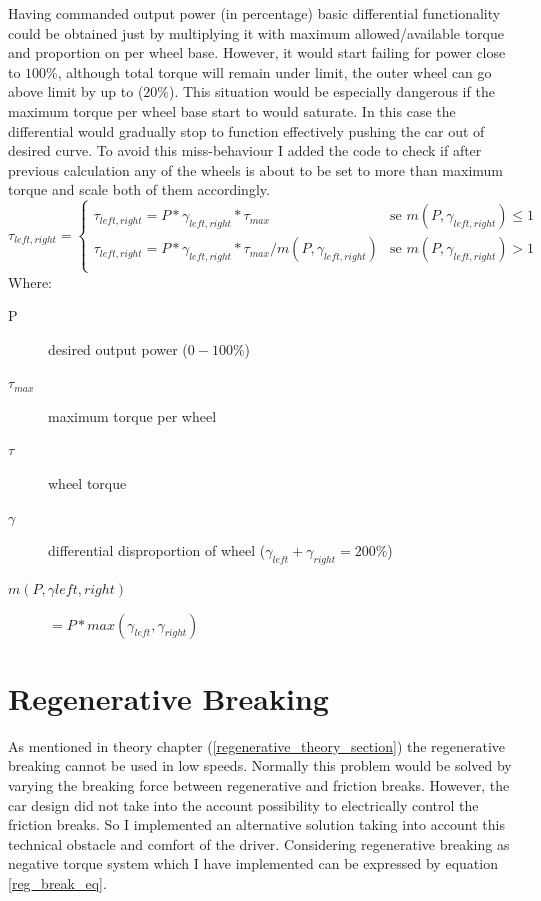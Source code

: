 Having commanded output power (in percentage) basic differential functionality could be obtained just by multiplying it with maximum allowed/available torque and proportion on per wheel base. However, it would start failing for power close to $100\% $, although total torque will remain under limit, the outer wheel can go above limit by up to ($20\% $).
This situation would be especially dangerous if the maximum torque per wheel base start to would saturate. In this case the differential would gradually stop to function effectively pushing the car out of desired curve.
To avoid this miss-behaviour I added the code to check if after previous calculation any of the wheels is about to be set to more than maximum torque and scale both of them accordingly.
\begin{equation*}
    \tau_{left,right} = \begin{cases}
        \tau_{left,right} = P * \gamma_{left,right} * \tau_{max} & \text{se $m(P,\gamma_{left,right}) \leq 1$}\\
        \tau_{left,right} = P * \gamma_{left,right} * \tau_{max} / m(P,\gamma_{left,right}) & \text{se $m(P,\gamma_{left,right}) > 1$}\\
    \end{cases}
\end{equation*}
Where:
\begin{description}
    \item[P] desired output power ($0-100\%$)
    \item[$\tau_{max}$] maximum torque per wheel
    \item[$\tau$] wheel torque
    \item[$\gamma$] differential disproportion of wheel ($\gamma_{left}+\gamma_{right}=200\%$)
    \item[$m(P,\gamma{left,right})$] $= P * max(\gamma_{left},\gamma_{right})$
\end{description}

\section{Regenerative Breaking}
As mentioned in theory chapter (\ref{regenerative_theory_section}) the regenerative breaking cannot be used in low speeds. Normally this problem would be solved by varying the breaking force between regenerative and friction breaks. However, the car design did not take into the account possibility to electrically control the friction breaks. So I implemented an alternative solution taking into account this technical obstacle and comfort of the driver.
Considering regenerative breaking as negative torque system which I have implemented can be expressed by equation \ref{reg_break_eq}.


